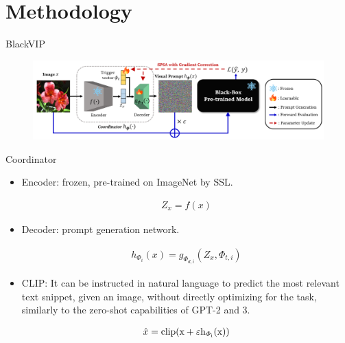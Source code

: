 \documentclass{beamer}
\begin{document}
\section{Methodology}

\begin{frame}{BlackVIP}
    \begin{figure}[l]
        \centering
        \includegraphics[width=\textwidth]{pic/2.png}
    \end{figure}
\end{frame}

\begin{frame}{Coordinator}
    \begin{itemize}
        \item Encoder: frozen, pre-trained on ImageNet by SSL.
        \par \begin{equation*}
            \begin{aligned}
                Z_x=f(x)
            \end{aligned}
        \end{equation*}
        \item Decoder: prompt generation network.
        \par \begin{equation*}
            \begin{aligned}
                h_{\varPhi_i}(x)=g_{\varPhi_{d,i}} (Z_x,\varPhi_{t,i})
            \end{aligned}
        \end{equation*}
        \item CLIP: It can be instructed in natural language to predict the most relevant text snippet, given an image, without directly optimizing for the task, similarly to the zero-shot capabilities of GPT-2 and 3.
        \par \begin{equation*}
            \begin{aligned}
                \hat{x}=\rm{clip}(x+\varepsilon h_{\varPhi_i}(x))
            \end{aligned}
        \end{equation*}
    \end{itemize}
\end{frame}
\end{document}

